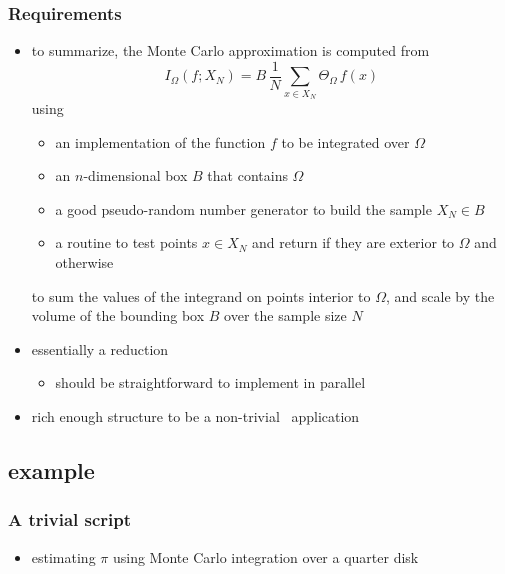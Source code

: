 \begin{frame}
%
  \frametitle{Requirements}
%
  \begin{itemize}
%
  \item to summarize, the Monte Carlo approximation is computed from
%
    \begin{equation}
      I_{\Omega} (f; X_{N})
      =
      B \, \frac{1}{N} \sum_{x \in X_{N}} \Theta_{\Omega} \, f(x)
    \end{equation}
%
    using
    \begin{itemize}
    \item an implementation of the function $f$ to be integrated over $\Omega$
    \item an $n$-dimensional box $B$ that contains $\Omega$
    \item a good pseudo-random number generator to build the sample $X_{N} \in B$
    \item a routine to test points $x \in X_{N}$ and return  if they are
      exterior to $\Omega$ and  otherwise
    \end{itemize}
%
    to sum the values of the integrand on points interior to $\Omega$, and scale by the
    volume of the bounding box $B$ over the sample size $N$
%
  \item essentially a reduction
    \begin{itemize}
    \item should be straightforward to implement in parallel
    \end{itemize}
%
  \item rich enough structure to be a non-trivial \pyre\ application
%
  \end{itemize}
%
\end{frame}


\subsection{example}

\begin{frame}
%
  \frametitle{A trivial script}
%
  \begin{itemize}
  \item estimating $\pi$ using Monte Carlo integration over a quarter disk
  \end{itemize}
%

%
\end{frame}

